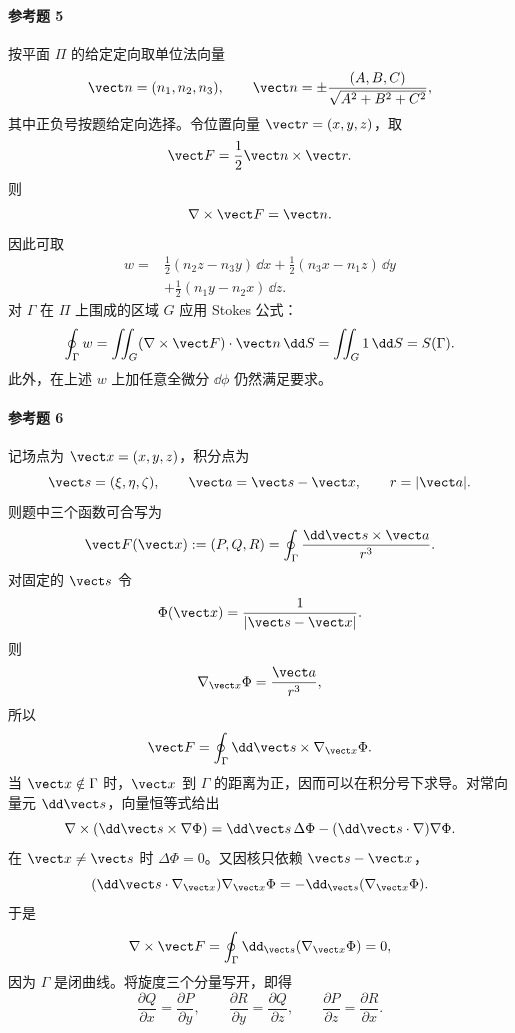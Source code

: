 \paragraph{参考题 5}
\begin{xsolution}
按平面 $\Pi$ 的给定定向取单位法向量
\[
  \vect n=(n_1,n_2,n_3),
  \qquad
  \vect n=\pm\frac{(A,B,C)}{\sqrt{A^2+B^2+C^2}},
\]
其中正负号按题给定向选择。令位置向量 $\vect r=(x,y,z)$，取
\[
  \vect F=\frac12\vect n\times\vect r.
\]
则
\[
  \nabla\times\vect F=\vect n.
\]
因此可取
\[
\boxed{
\begin{aligned}
w={}&\frac12(n_2z-n_3y)\,\dd x
+\frac12(n_3x-n_1z)\,\dd y\\
&+\frac12(n_1y-n_2x)\,\dd z.
\end{aligned}}
\]
对 $\Gamma$ 在 $\Pi$ 上围成的区域 $G$ 应用 Stokes 公式：
\[
  \oint_\Gamma w
  =\iint_G(\nabla\times\vect F)\cdot\vect n\,\dd S
  =\iint_G1\,\dd S=S(\Gamma).
\]
此外，在上述 $w$ 上加任意全微分 $\dd\phi$ 仍然满足要求。
\end{xsolution}

\paragraph{参考题 6}
\begin{xsolution}
记场点为 $\vect x=(x,y,z)$，积分点为
\[
  \vect s=(\xi,\eta,\zeta),
  \qquad \vect a=\vect s-\vect x,
  \qquad r=|\vect a|.
\]
则题中三个函数可合写为
\[
  \vect F(\vect x):=(P,Q,R)
  =\oint_\Gamma\frac{\dd\vect s\times\vect a}{r^3}.
\]
对固定的 $\vect s$ 令
\[
  \Phi(\vect x)=\frac1{|\vect s-\vect x|}.
\]
则
\[
  \nabla_{\vect x}\Phi=\frac{\vect a}{r^3},
\]
所以
\[
  \vect F=\oint_\Gamma\dd\vect s\times\nabla_{\vect x}\Phi.
\]
当 $\vect x\notin\Gamma$ 时，$\vect x$ 到 $\Gamma$ 的距离为正，因而可以在积分号下求导。对常向量元 $\dd\vect s$，向量恒等式给出
\[
\nabla\times(\dd\vect s\times\nabla\Phi)
=\dd\vect s\,\Delta\Phi-(\dd\vect s\cdot\nabla)\nabla\Phi.
\]
在 $\vect x\ne\vect s$ 时 $\Delta\Phi=0$。又因核只依赖 $\vect s-\vect x$，
\[
  (\dd\vect s\cdot\nabla_{\vect x})\nabla_{\vect x}\Phi
  =-\dd_{\vect s}(\nabla_{\vect x}\Phi).
\]
于是
\[
  \nabla\times\vect F
  =\oint_\Gamma\dd_{\vect s}(\nabla_{\vect x}\Phi)=0,
\]
因为 $\Gamma$ 是闭曲线。将旋度三个分量写开，即得
\[
  \boxed{
  \frac{\partial Q}{\partial x}=\frac{\partial P}{\partial y},\qquad
  \frac{\partial R}{\partial y}=\frac{\partial Q}{\partial z},\qquad
  \frac{\partial P}{\partial z}=\frac{\partial R}{\partial x}}.
\]
\end{xsolution}

